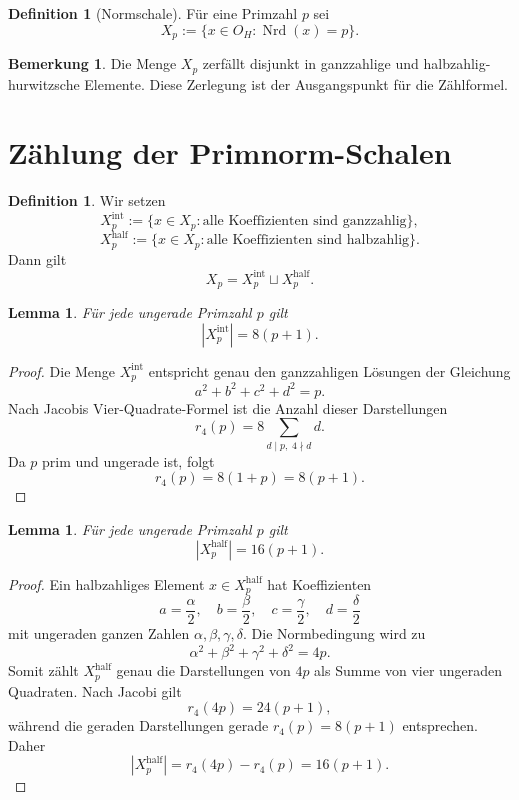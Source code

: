 \documentclass[a4paper,12pt]{article}
\newtheorem{lemma}[satz]{Lemma}
\theoremstyle{definition}
\newtheorem{definition}[satz]{Definition}
\newtheorem{bemerkung}[satz]{Bemerkung}
\numberwithin{equation}{section}
\newcommand{\OH}{O_H}
\newcommand{\Nrd}{\operatorname{Nrd}}
\begin{document}
	\begin{definition}[Normschale]
		Für eine Primzahl \(p\) sei
		\[
		X_p:=\{x\in \OH:\Nrd(x)=p\}.
		\]
	\end{definition}
	
	\begin{bemerkung}
		Die Menge \(X_p\) zerfällt disjunkt in ganzzahlige und halbzahlig-hurwitzsche Elemente. Diese Zerlegung ist der Ausgangspunkt für die Zählformel.
	\end{bemerkung}
	
	\section{Zählung der Primnorm-Schalen}
	
	\begin{definition}
		Wir setzen
		\[
		X_p^{\mathrm{int}}
		:=
		\{x\in X_p:\text{alle Koeffizienten sind ganzzahlig}\},
		\]
		\[
		X_p^{\mathrm{half}}
		:=
		\{x\in X_p:\text{alle Koeffizienten sind halbzahlig}\}.
		\]
		Dann gilt
		\[
		X_p=X_p^{\mathrm{int}}\sqcup X_p^{\mathrm{half}}.
		\]
	\end{definition}
	
	\begin{lemma}
		Für jede ungerade Primzahl \(p\) gilt
		\[
		|X_p^{\mathrm{int}}|=8(p+1).
		\]
	\end{lemma}
	
	\begin{proof}
		Die Menge \(X_p^{\mathrm{int}}\) entspricht genau den ganzzahligen Lösungen der Gleichung
		\[
		a^2+b^2+c^2+d^2=p.
		\]
		Nach Jacobis Vier-Quadrate-Formel ist die Anzahl dieser Darstellungen
		\[
		r_4(p)=8\sum_{d\mid p,\;4\nmid d} d.
		\]
		Da \(p\) prim und ungerade ist, folgt
		\[
		r_4(p)=8(1+p)=8(p+1).
		\]
	\end{proof}
	
	\begin{lemma}
		Für jede ungerade Primzahl \(p\) gilt
		\[
		|X_p^{\mathrm{half}}|=16(p+1).
		\]
	\end{lemma}
	
	\begin{proof}
		Ein halbzahliges Element \(x\in X_p^{\mathrm{half}}\) hat Koeffizienten
		\[
		a=\frac{\alpha}{2},\quad b=\frac{\beta}{2},\quad c=\frac{\gamma}{2},\quad d=\frac{\delta}{2}
		\]
		mit ungeraden ganzen Zahlen \(\alpha,\beta,\gamma,\delta\). Die Normbedingung wird zu
		\[
		\alpha^2+\beta^2+\gamma^2+\delta^2=4p.
		\]
		Somit zählt \(X_p^{\mathrm{half}}\) genau die Darstellungen von \(4p\) als Summe von vier ungeraden Quadraten. Nach Jacobi gilt
		\[
		r_4(4p)=24(p+1),
		\]
		während die geraden Darstellungen gerade \(r_4(p)=8(p+1)\) entsprechen. Daher
		\[
		|X_p^{\mathrm{half}}|=r_4(4p)-r_4(p)=16(p+1).
		\]
	\end{proof}
	
\end{document}
